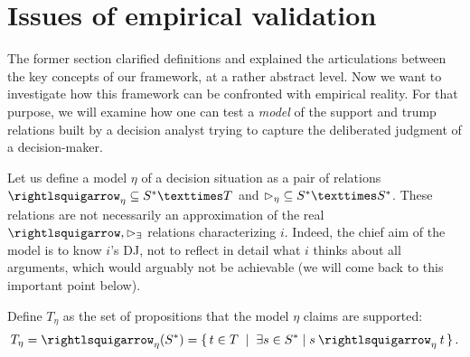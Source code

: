 \documentclass[version=3.21, pagesize, twoside=off, bibliography=totoc, DIV=calc, fontsize=12pt, a4paper]{scrartcl}
\begin{document}
\section{Issues of empirical validation}
\label{sec:empirical}
The former section clarified definitions and explained the articulations between the key concepts of our framework, at a rather abstract level. Now we want to investigate how this framework can be confronted with empirical reality. For that purpose, we will examine how one can test a \emph{model} of the support and trump relations built by a decision analyst trying to capture the deliberated judgment of a decision-maker.

Let us define a model $\eta$ of a decision situation as a pair of relations $\mleadsto \subseteq \allargs × T$ and $\mbeats \subseteq \allargs × \allargs$. These relations are not necessarily an approximation of the real $\ileadsto, \ibeatse$ relations characterizing $i$. Indeed, the chief aim of the model is to know $i$’s \ac{DJ}, not to reflect in detail what $i$ thinks about all arguments, which would arguably not be achievable (we will come back to this important point below).

Define $T_\eta$ as the set of propositions that the model $\eta$ claims are supported:
\begin{equation}
	T_\eta = {\mleadsto}(\allargs) = \set{t \in T \suchthat \exists \ar \in \allargs \suchthat \ar \mleadsto t}.
\end{equation}
\end{document}
